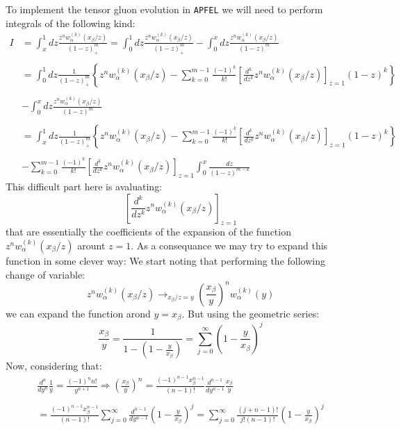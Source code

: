 \documentclass[10pt,a4paper]{article}
\begin{document}
To implement the tensor gluon evolution in {\tt APFEL} we will need to
perform integrals of the following kind:
\begin{equation}
\begin{array}{rl}
I &=\displaystyle \int_x^1 dz\frac{z^n w_{\alpha}^{(k)}(x_\beta/z)}{(1-z)_+^m} =
\int_0^1 dz\frac{z^n w_{\alpha}^{(k)}(x_\beta/z)}{(1-z)_+^m} -
\int_0^x dz\frac{z^n w_{\alpha}^{(k)}(x_\beta/z)}{(1-z)^m}\\
\\
& =\displaystyle \int_0^1 dz\frac{1}{(1-z)_+^m}\left\{z^n
  w_{\alpha}^{(k)}(x_\beta/z) - \sum_{k=0}^{m-1} \frac{(-1)^k}{k!}
  \left[\frac{d^k}{dz^k}z^n
  w_{\alpha}^{(k)}(x_\beta/z) \right]_{z=1} (1-z)^k
\right\} \\
\\
&- \displaystyle \int_0^x dz\frac{z^n
  w_{\alpha}^{(k)}(x_\beta/z)}{(1-z)^m}\\
\\
& = \displaystyle \int_x^1 dz\frac{1}{(1-z)_+^m}\left\{z^n
  w_{\alpha}^{(k)}(x_\beta/z) - \sum_{k=0}^{m-1} \frac{(-1)^k}{k!}
  \left[\frac{d^k}{dz^k}z^n
  w_{\alpha}^{(k)}(x_\beta/z) \right]_{z=1} (1-z)^k
\right\} \\
\\
&- \displaystyle \sum_{k=0}^{m-1} \frac{(-1)^k}{k!}
  \left[\frac{d^k}{dz^k}z^n
  w_{\alpha}^{(k)}(x_\beta/z) \right]_{z=1} \int_0^x\frac{dz}{(1-z)^{m-k}}
\end{array}
\end{equation}
This difficult part here is avaluating:
\begin{equation}
\left[\frac{d^k}{dz^k}z^n w_{\alpha}^{(k)}(x_\beta/z) \right]_{z=1}
\end{equation}
that are essentially the coefficients of the expansion of the function
$z^n w_{\alpha}^{(k)}(x_\beta/z)$ arount $z=1$. As a consequance we
may try to expand this function in some clever way: We start noting
that performing the following change of variable:
\begin{equation}
z^n w_{\alpha}^{(k)}(x_\beta/z) \mathop{\longrightarrow}_{x_\beta/z=y}
\left(\frac{x_\beta}{y}\right)^n w_{\alpha}^{(k)}(y)
\end{equation}
we can expand the function arond $y=x_\beta$. But using the geometric series:
\begin{equation}
\frac{x_\beta}{y} = \frac{1}{1-\left(1-\frac{y}{x_\beta}\right)} = \sum_{j=0}^\infty \left(1-\frac{y}{x_\beta}\right)^j
\end{equation}
Now, considering that:
\begin{equation}\label{Exp1}
\begin{array}{c}
\displaystyle\frac{d^n}{dy^n}\frac{1}{y} = \frac{(-1)^nn!}{y^{n+1}}\Longrightarrow
\left(\frac{x_\beta}{y}\right)^n =
\frac{(-1)^{n-1}x_\beta^{n-1}}{(n-1)!}\frac{d^{n-1}}{dy^{n-1}}\frac{x_\beta}{y}\\
\\
\displaystyle = \frac{(-1)^{n-1}x_\beta^{n-1}}{(n-1)!}\sum_{j=0}^\infty \frac{d^{n-1}}{dy^{n-1}}\left(1-\frac{y}{x_\beta}\right)^j=\sum_{j=0}^\infty\frac{(j+n-1)!}{j!(n-1)!}\left(1-\frac{y}{x_\beta}\right)^j
\end{array}
\end{equation}
\end{document}
